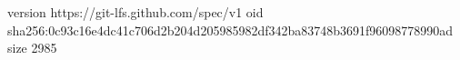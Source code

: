 version https://git-lfs.github.com/spec/v1
oid sha256:0c93c16e4dc41c706d2b204d205985982df342ba83748b3691f96098778990ad
size 2985

